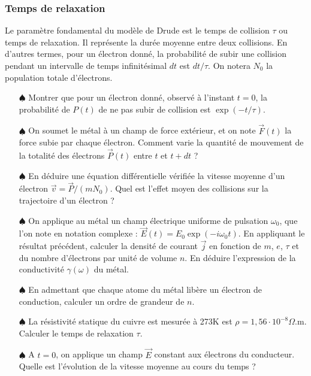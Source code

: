 \documentclass{report}
\begin{document}
\subsubsection*{Temps de relaxation}

Le paramètre fondamental du modèle de Drude est le temps de collision  $\tau$ ou temps de relaxation. Il représente la durée moyenne entre deux collisions. En d'autres termes, pour un électron donné, la probabilité de subir une collision pendant un intervalle de temps infinitésimal $dt$ est $dt/\tau$. On notera $N_0$ la population totale d'électrons.

\begin{itemize}
	
	\item[$\spadesuit$]	 Montrer que pour un électron donné, observé à l'instant $t=0$, la probabilité de $P(t)$ de ne pas subir de collision est $\exp(-t/\tau)$. 
	
	\item[$\spadesuit$] On soumet le métal à un champ de force extérieur, et on note $\vec{F}(t)$ la force subie par chaque électron. Comment varie la quantité de mouvement de la totalité des électrons $\vec{P}(t)$ entre $t$ et $t+dt$ ?
	
	\item[$\spadesuit$] En déduire une équation différentielle vérifiée la vitesse moyenne d'un électron $\vec{v}=\vec{P}/(mN_0)$. Quel est l'effet moyen des collisions sur la trajectoire d'un électron ?
	
	\item[$\spadesuit$] On applique au métal un champ électrique uniforme de pulsation $\omega_0$, que l'on note en notation complexe : $\vec{E}(t)=E_0\exp(-i\omega_0t)$. En appliquant le résultat précédent, calculer la densité de courant $\vec{j}$ en fonction de $m$, $e$, $\tau$ et du nombre d'électrons par unité de volume $n$. En déduire l'expression de la conductivité $\gamma(\omega)$ du métal.
	
	\item[$\spadesuit$] En admettant que chaque atome du métal libère un électron de conduction, calculer un ordre de grandeur de $n$.
	
	\item[$\spadesuit$] La résistivité statique du cuivre est mesurée à 273K est $\rho=1,56\cdot10^{-8}\Omega$.m. Calculer le temps de relaxation $\tau$. 
	
	\item[$\spadesuit$] A $t=0$, on applique un champ $\vec{E}$ constant aux électrons du conducteur. Quelle est l'évolution de la vitesse moyenne au cours du temps ? 
\end{itemize}
\end{document}
